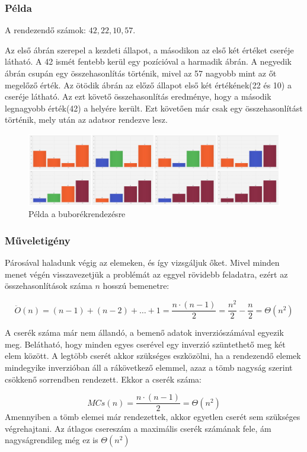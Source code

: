 \documentclass{elteikthesis}
\begin{document}
 \subsubsection{Példa}
 A rendezendő számok: $42, 22, 10, 57$.\par
 Az első ábrán szerepel a kezdeti állapot, a másodikon az első két értéket cseréje látható. A 42 ismét fentebb kerül egy pozícióval a harmadik ábrán. A negyedik ábrán csupán egy összehasonlítás történik, mivel az 57 nagyobb mint az őt megelőző érték. Az ötödik ábrán az előző állapot első két értékének(22 és 10) a cseréje látható. Az ezt követő összehasonlítás eredménye, hogy a második legnagyobb érték(42) a helyére került. Ezt követően már csak egy összehasonlítást történik, mely után az adatsor rendezve lesz.\par
 \begin{figure}[H]
 	\centering
 	\includegraphics[width=1\textwidth]{pics/bubble.jpg}
 	\caption{Példa a buborékrendezésre}
 \end{figure}\par
 \subsubsection{Műveletigény}
Párosával haladunk végig az elemeken, és így vizsgáljuk őket. Mivel minden menet végén visszavezetjük a problémát az eggyel rövidebb feladatra, ezért az összehasonlítások száma $n$ hosszú bemenetre:\par
$$\ddot{O}(n)=(n-1)+(n-2)+\ldots+1=\frac{n\cdot(n-1)}{2}=\frac{n^2}{2}-\frac{n}{2}=\Theta(n^2)$$
\par A cserék száma már nem állandó, a bemenő adatok inverziószámával egyezik meg. Belátható, hogy minden egyes cserével egy inverzió szüntethető meg két elem között. A legtöbb cserét akkor szükséges eszközölni, ha a rendezendő elemek mindegyike inverzióban áll a rákövetkező elemmel, azaz a tömb nagyság szerint csökkenő sorrendben rendezett. Ekkor a cserék száma:\par
$$MCs(n)=\frac{n\cdot(n-1)}{2}=\Theta(n^2)$$
Amennyiben a tömb elemei már rendezettek, akkor egyetlen cserét sem szükséges végrehajtani.
Az átlagos csereszám a maximális cserék számának fele\cite{Fekete}, ám nagyságrendileg még ez is $\Theta(n^2)$
\end{document}
